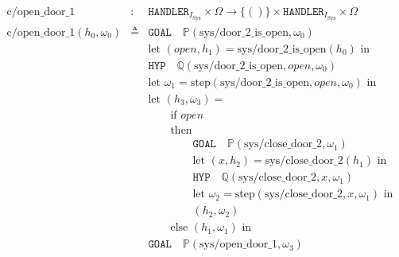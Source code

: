 \begin{figure}
  \centering
  \[
    \begin{array}{rcl}
      \mathrm{c/open\_door\_1}
      & :
      & \mathtt{HANDLER}_{I_{\mathrm{Sys}}} \times \Omega \rightarrow \{()\} \times
        \mathtt{HANDLER}_{I_{\mathrm{Sys}}} \times \Omega \\
      \mathrm{c/open\_door\_1}(h_0, \omega_0)
      & \triangleq
      & \mathtt{GOAL} \quad \mathbb{P}(\mathrm{sys/door\_2\_is\_open}, \omega_0) \\

      &
      & \text{let } (\mathit{open}, h_1) = \mathrm{sys/door\_2\_is\_open}(h_0) \text{ in} \\

      &
      & \mathtt{HYP} \quad \mathbb{Q}(\mathrm{sys/door\_2\_is\_open}, open, \omega_0) \\

      &
      & \text{let }\omega_1 = \mathrm{step}(\mathrm{sys/door\_2\_is\_open}, \mathit{open}, \omega_0) \text{ in} \\

      &
      & \text{let }(h_3, \omega_3) = \\

      &
      & \qquad\text{if }\mathit{open} \\

      &
      & \qquad\text{then} \\

      &
      & \qquad\qquad\mathtt{GOAL} \quad \mathbb{P}(\mathrm{sys/close\_door\_2}, \omega_1) \\

      &
      & \qquad\qquad\text{let }(x, h_2) =
        \mathrm{sys/close\_door\_2}(h_1) \text{ in} \\

      &
      & \qquad\qquad\mathtt{HYP} \quad \mathbb{Q}(\mathrm{sys/close\_door\_2}, x, \omega_1) \\

      &
      & \qquad\qquad\text{let }\omega_2 =
        \mathrm{step}(\mathrm{sys/close\_door\_2}, x, \omega_1) \text{ in} \\

      &
      & \qquad\qquad(h_2, \omega_2) \\

      &
      & \qquad\text{else }(h_1, \omega_1) \text{ in} \\

      &
      & \mathtt{GOAL} \quad \mathbb{P}(\mathrm{sys/open\_door\_1}, \omega_3) \\


\end{array}\]
\end{figure}
